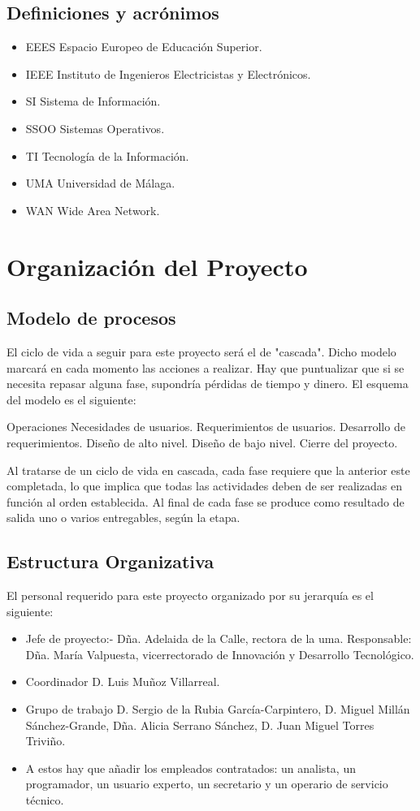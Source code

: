 \documentclass[11pt,a4paper,spanish,twoside]{report}
\begin{document}
\section{Definiciones y acrónimos}
\begin{itemize}
\item{EEES} Espacio Europeo de Educación Superior.
\item{IEEE} Instituto de Ingenieros Electricistas y Electrónicos.
\item{SI} Sistema de Información.
\item{SSOO} Sistemas Operativos.
\item{TI} Tecnología de la Información.
\item{UMA} Universidad de Málaga.
\item{WAN} Wide Area Network.
\end{itemize}

\chapter{Organización del Proyecto}
\section{Modelo de procesos}
El ciclo de vida a seguir para este proyecto será el de "cascada". Dicho 
modelo marcará en cada momento las acciones a realizar. Hay que puntualizar 
que si se necesita repasar alguna fase, supondría pérdidas de tiempo y dinero.
El esquema del modelo es el siguiente:

Operaciones
	Necesidades de usuarios.
		Requerimientos de usuarios.
			Desarrollo de requerimientos.
				Diseño de alto nivel.
					Diseño de bajo nivel.
						Cierre del proyecto.

Al tratarse de un ciclo de vida en cascada, cada fase requiere que la anterior 
este completada, lo que implica que todas las actividades deben de ser 
realizadas en función al orden establecida. Al final de cada fase se produce 
como resultado de salida uno o varios entregables, según la etapa.
\section{Estructura Organizativa}
El personal requerido para este proyecto organizado por su jerarquía es el 
siguiente:
\begin{itemize}
\item Jefe de proyecto:- Dña. Adelaida de la Calle, rectora de la uma.
Responsable: Dña. María Valpuesta, vicerrectorado de Innovación y Desarrollo 
Tecnológico.
\item Coordinador D. Luis Muñoz Villarreal.
\item Grupo de trabajo D. Sergio de la Rubia García-Carpintero, D. Miguel 
Millán Sánchez-Grande, Dña. Alicia Serrano Sánchez, D. Juan Miguel Torres 
Triviño. 
\item A estos hay que añadir los empleados contratados: un analista, un 
programador, un usuario experto, un secretario y un operario de servicio 
técnico.
\end{itemize}
\end{document}

